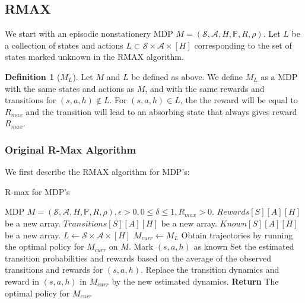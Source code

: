 \documentclass[12pt, letterpaper]{article}
\theoremstyle{definition}
\newtheorem*{defn}{Definition}
\theoremstyle{remark}
\begin{document}
\subsection{RMAX}

We start with an episodic nonstationery MDP \(M = (\mathcal{S}, \mathcal{A}, H, \mathbb{P}, R, \rho)\). Let \(L\) be a collection of states and actions \(L \subset \mathcal{S} \times \mathcal{A} \times [H]\) corresponding to the set of states marked unknown in the RMAX algorithm.

\begin{defn}[\(M_L\)]
    Let \(M\) and \(L\) be defined as above. We define \(M_L\) as a MDP with the same states and actions as \(M\), and with the same rewards and transitions for \((s, a, h) \notin L\). For \((s, a, h) \in L\), the the reward will be equal to \(R_{max}\) and the transition will lead to an absorbing state that always gives reward \(R_{max}\).
\end{defn}

\subsubsection{Original R-Max Algorithm}

We first describe the RMAX algorithm for MDP's:

\begin{algorithm}[H]
\caption{R-max for MDP's}
\begin{algorithmic}[1]
    \Require MDP \(M = (\mathcal{S}, \mathcal{A}, H, \mathbb{P}, R, \rho), \epsilon > 0, 0 \leq\delta \leq 1, R_{max} > 0\).
        \State $Rewards[S][A][H]$ be a new array.
        \State $Transitions[S][A][H]$ be a new array.
        \State $Known[S][A][H]$ be a new array.
        \State $L \gets \mathcal{S} \times \mathcal{A} \times [H]$
        \State $M_{curr} \gets M_L$
                \State Obtain trajectories by running the optimal policy for \(M_{curr}\) on \(M\).
                    \State Mark \((s, a, h)\) as known
                    \State Set the estimated transition probabilities and rewards based on the average of the observed transitions and rewards for \((s, a, h)\).
                    \State Replace the transition dynamics and reward in \((s, a, h)\) in \(M_{curr}\) by the new estimated dynamics.
                \EndIf
            \EndWhile
        \EndFor
        \State \textbf{Return} The optimal policy for \(M_{curr}\)

    \EndProcedure
    
\end{algorithmic}
\end{algorithm}
\end{document}
